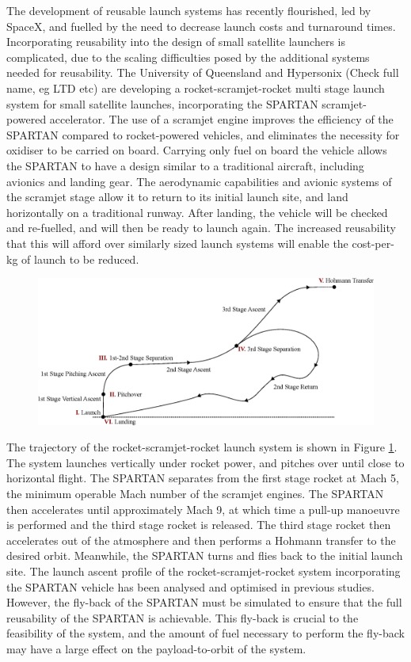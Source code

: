 \documentclass[conf]{new-aiaa}
\begin{document}
The development of reusable launch systems has recently flourished, led by SpaceX, and fuelled by the need to decrease launch costs and turnaround times. Incorporating reusability into the design of small satellite launchers is complicated, due to the scaling difficulties posed by the additional systems needed for reusability. 
The University of Queensland and Hypersonix (Check full name, eg LTD etc) are developing a rocket-scramjet-rocket multi stage launch system for small satellite launches, incorporating the SPARTAN scramjet-powered accelerator. 
The use of a scramjet engine improves the efficiency of the SPARTAN compared to rocket-powered vehicles, and eliminates the necessity for oxidiser to be carried on board. Carrying only fuel on board the vehicle allows the SPARTAN to have a design similar to a traditional aircraft, including avionics and landing gear. The aerodynamic capabilities and avionic systems of the scramjet stage allow it to return to its initial launch site, and land horizontally on a traditional runway. After landing, the vehicle will be checked and re-fuelled, and will then be ready to launch again. The increased reusability that this will afford over similarly sized launch systems will enable the cost-per-kg of launch to be reduced. 

\begin{figure}
\centering
\includegraphics[width=0.9\linewidth]{Figures/Traj}
\caption{}
\label{fig:Traj}
\end{figure}


The trajectory of the rocket-scramjet-rocket launch system is shown in Figure \ref{fig:Traj}. The system launches vertically under rocket power, and pitches over until close to horizontal flight. The SPARTAN separates from the first stage rocket at Mach 5, the minimum operable Mach number of the scramjet engines. The SPARTAN then accelerates until approximately Mach 9, at which time a pull-up manoeuvre is performed and the third stage rocket is released. The third stage rocket then accelerates out of the atmosphere and then performs a Hohmann transfer to the desired orbit. Meanwhile, the SPARTAN turns and flies back to the initial launch site. 
The launch ascent profile of the rocket-scramjet-rocket system incorporating the SPARTAN vehicle has been analysed and optimised in previous studies. However, the fly-back of the SPARTAN must be simulated to ensure that the full reusability of the SPARTAN is achievable. This fly-back is crucial to the feasibility of the system, and the amount of fuel necessary to perform the fly-back may have a large effect on the payload-to-orbit of the system. 
\end{document}
